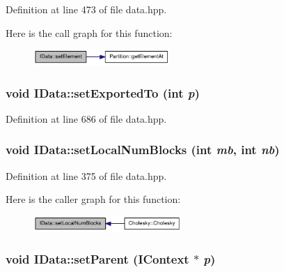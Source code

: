 Definition at line 473 of file data.hpp.

Here is the call graph for this function:\nopagebreak
\begin{figure}[H]
\begin{center}
\leavevmode
\includegraphics[width=147pt]{class_i_data_a968b912f4fd9053481f2c29c96471efa_cgraph}
\end{center}
\end{figure}
\hypertarget{class_i_data_ae0c98c07c7ae883a54ac57df37c3bb3b}{
\subsubsection[{setExportedTo}]{\setlength{\rightskip}{0pt plus 5cm}void IData::setExportedTo (int {\em p})}}
\label{class_i_data_ae0c98c07c7ae883a54ac57df37c3bb3b}


Definition at line 686 of file data.hpp.\hypertarget{class_i_data_a80cee3fcea65aff356ddceeece06dc9f}{
\subsubsection[{setLocalNumBlocks}]{\setlength{\rightskip}{0pt plus 5cm}void IData::setLocalNumBlocks (int {\em mb}, \/  int {\em nb})}}
\label{class_i_data_a80cee3fcea65aff356ddceeece06dc9f}


Definition at line 375 of file data.hpp.

Here is the caller graph for this function:\nopagebreak
\begin{figure}[H]
\begin{center}
\leavevmode
\includegraphics[width=160pt]{class_i_data_a80cee3fcea65aff356ddceeece06dc9f_icgraph}
\end{center}
\end{figure}
\hypertarget{class_i_data_a4442a7d48bf3e6653216f8eada3f26a2}{
\subsubsection[{setParent}]{\setlength{\rightskip}{0pt plus 5cm}void IData::setParent ({\bf IContext} $\ast$ {\em p})}}
\label{class_i_data_a4442a7d48bf3e6653216f8eada3f26a2}


